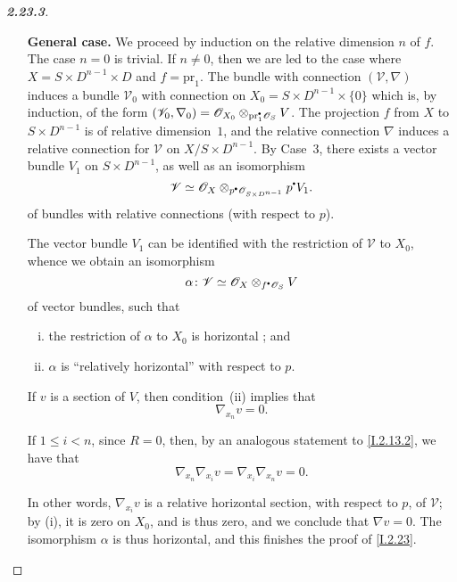 \documentclass{report}
\theoremstyle{plain}
\theoremstyle{definition}
\newcommand{\sh}[1]{{\mathscr{#1}}}
\newcommand{\sbullet}{{\mathbin{\vcenter{\hbox{\scalebox{.5}{$\bullet$}}}}}}
\newcommand{\pr}{\mathrm{pr}}
\renewcommand{\leq}{\leqslant}
\newcommand{\oldpage}[1]{\marginpar{\footnotesize$\Big\vert$ \textit{p.~#1}}}
\begin{document}
\begin{proof}[\normalfont\textbf{2.23.3}]
\begin{enumerate}[\bf {Case}~1:]
      We can suppose that $S$ is a closed analytic subset of $D^n$, and that $X=S\times D$ and $f=\pr_1$.
      The relative local systems (resp. the modules with relative connections) on $X$ can then be identified with the local relative systems (resp. the modules with relative connections) on $D^n\times D$ that are annihilated by the inverse image of the ideal that defines $S$, and we conclude by using Case~2.
    \item[\bf General case.]
      We proceed by induction on the relative dimension $n$ of $f$.
      The case $n=0$ is trivial.
      If $n\neq0$, then we are led to the case where $X=S\times D^{n-1}\times D$ and $f=\pr_1$.
      The bundle with connection $(\sh{V},\nabla)$ induces a bundle $\sh{V}_0$ with connection on $X_0=S\times D^{n-1}\times\{0\}$ which is, by induction, of the form $(\sh{V}_0,\nabla_0) = \sh{O}_{X_0}\otimes_{\pr_1^\sbullet\sh{O}_S}V$.
      The projection $f$ from $X$ to $S\times D^{n-1}$ is of relative dimension~$1$, and the relative connection $\nabla$ induces a relative connection for $\sh{V}$ on $X/S\times D^{n-1}$.
      By Case~3, there exists a vector bundle $V_1$ on $S\times D^{n-1}$, as well as an isomorphism
      \[
        \sh{V} \simeq \sh{O}_X\otimes_{p^\sbullet\sh{O}_{S\times D^{n-1}}}p^\sbullet V_1.
      \]
      of bundles with relative connections (with respect to $p$).

      The vector bundle $V_1$ can be identified with the restriction of $\sh{V}$ to $X_0$, whence we obtain an isomorphism
      \[
        \alpha\colon \sh{V}\simeq\sh{O}_X\otimes_{f^\sbullet\sh{O}_S}V
      \]
      of vector bundles, such that
      \begin{enumerate}[(i)]
        \item the restriction of $\alpha$ to $X_0$ is horizontal ; and
        \item $\alpha$ is ``relatively horizontal'' with respect to $p$.
      \end{enumerate}

      If $v$ is a section of $V$, then condition~(ii) implies that
      \[
        \nabla_{x_n}v = 0.
      \]

      If $1\leq i<n$, since $R=0$, then, by an analogous statement to \cref{I.2.13.2}, we have that
      \[
        \nabla_{x_n}\nabla_{x_i}v = \nabla_{x_i}\nabla_{x_n}v = 0.
      \]

      In other words, $\nabla_{x_i}v$ is a relative horizontal section, with respect to $p$, of $\sh{V}$;
      by (i), it is zero on $X_0$, and is thus zero, and we conclude that $\nabla v=0$.
      The isomorphism $\alpha$ is thus horizontal, and this finishes the proof
\oldpage{19}
      of \cref{I.2.23}.
  \end{enumerate}
\end{proof}
\end{document}
